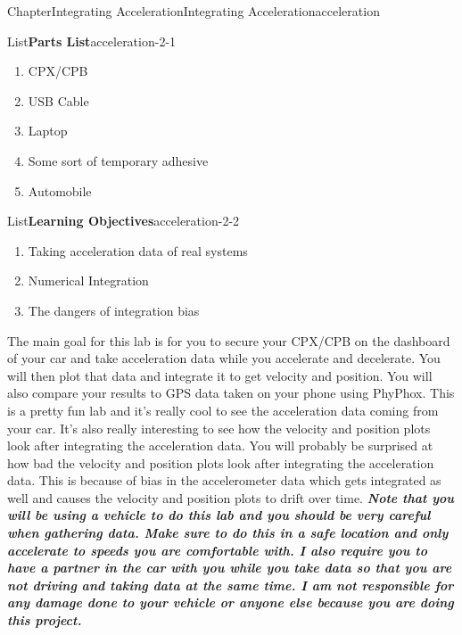 \documentclass[oneside,10pt,]{book}
\newcommand{\alert}[1]{\textbf{\textit{#1}}}
\numberwithin{equation}{section}
\begin{document}
\typeout{************************************************}
%
\begin{chapterptx}{Chapter}{Integrating Acceleration}{}{Integrating Acceleration}{}{}{acceleration}
\renewcommand*{\chaptername}{Chapter}
\begin{introduction}{}%
\begin{listptx}{List}{\textbf{Parts List}}{acceleration-2-1}{}%
%
\begin{enumerate}
\item{}CPX\slash{}CPB%
\item{}USB Cable%
\item{}Laptop%
\item{}Some sort of temporary adhesive%
\item{}Automobile%
\end{enumerate}
\end{listptx}%
\begin{listptx}{List}{\textbf{Learning Objectives}}{acceleration-2-2}{}%
%
\begin{enumerate}
\item{}Taking acceleration data of real systems%
\item{}Numerical Integration%
\item{}The dangers of integration bias%
\end{enumerate}
\end{listptx}%
The main goal for this lab is for you to secure your CPX\slash{}CPB on the dashboard of your car and take acceleration data while you accelerate and decelerate. You will then plot that data and integrate it to get velocity and position. You will also compare your results to GPS data taken on your phone using PhyPhox. This is a pretty fun lab and it's really cool to see the acceleration data coming from your car. It's also really interesting to see how the velocity and position plots look after integrating the acceleration data. You will probably be surprised at how bad the velocity and position plots look after integrating the acceleration data. This is because of bias in the accelerometer data which gets integrated as well and causes the velocity and position plots to drift over time. \alert{Note that you will be using a vehicle to do this lab and you should be very careful when gathering data. Make sure to do this in a safe location and only accelerate to speeds you are comfortable with. I also require you to have a partner in the car with you while you take data so that you are not driving and taking data at the same time. I am not responsible for any damage done to your vehicle or anyone else because you are doing this project.}%

\end{introduction}
\end{chapterptx}
\end{document}
